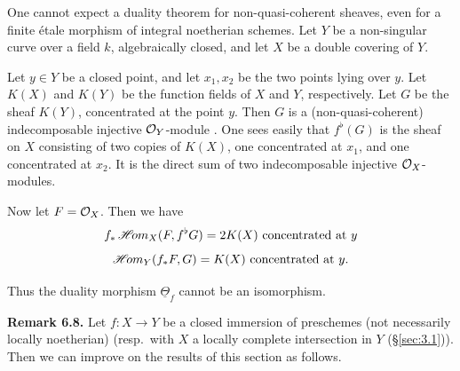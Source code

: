 \begin{example*}
One cannot expect a duality theorem for non-quasi-coherent sheaves, even for a finite \'etale morphism of integral noetherian schemes. Let $Y$ be a non-singular curve over a field $k$, algebraically closed, and let $X$ be a double covering of $Y$.
\begin{center}


\end{center}
Let $y\in Y$ be a closed point, and let $x_1,x_2$ be the two points lying over $y$. Let $K(X)$ and $K(Y)$ be the function fields of $X$ and $Y$, respectively. Let $G$ be the sheaf $K(Y)$, concentrated at the point $y$. Then $G$ is a (non-quasi-coherent) indecomposable injective $\mathcal{O}_Y$-module . One sees easily that $f^{\flat}(G)$ is the sheaf on $X$ consisting of two copies of $K(X)$, one concentrated at $x_1$, and one concentrated at $x_2$. It is the direct sum of two indecomposable injective $\mathcal{O}_X$-modules.

Now let $F=\mathcal{O}_X$. Then we have
\[
f_*\mathop{\mathscr{H}\!om}\nolimits_X(F, f^{\flat}G) = 2K(X) \text{ concentrated at } y
\]
\[
\mathop{\mathscr{H}\!om}\nolimits_Y(f_*F,G) = K(X) \text{ concentrated at } y.
\]

Thus the duality morphism $\underline{\Theta}_f$ cannot be an isomorphism.
\end{example*}

\textbf{Remark 6.8.}\label{rem:3.6.8}
Let $f\colon X\to Y$ be a closed immersion of preschemes (not necessarily locally noetherian) (resp.\ with $X$ a locally complete intersection in $Y$ (\S\ref{sec:3.1})). Then we can improve on the results of this section as follows.

